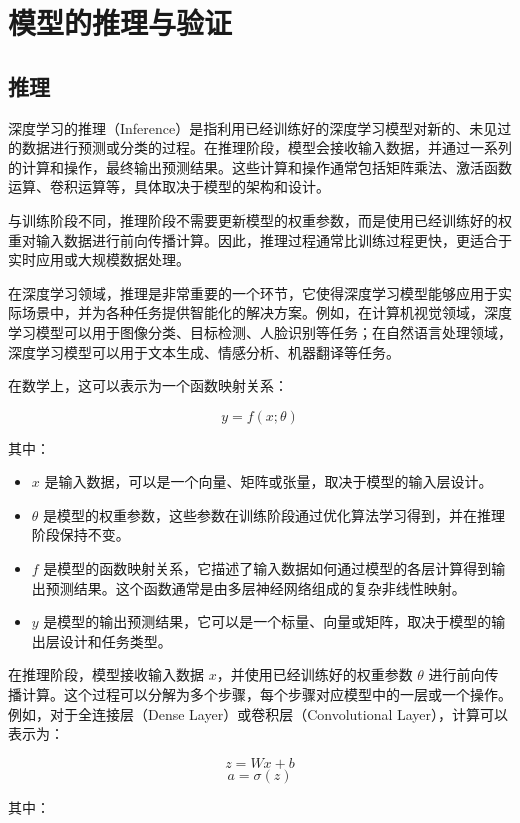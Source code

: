 \chapter{模型的推理与验证}
\label{chapter:5}

\section{推理}

深度学习的推理（Inference）是指利用已经训练好的深度学习模型对新的、未见过的数据进行预测或分类的过程。在推理阶段，模型会接收输入数据，并通过一系列的计算和操作，最终输出预测结果。这些计算和操作通常包括矩阵乘法、激活函数运算、卷积运算等，具体取决于模型的架构和设计。

与训练阶段不同，推理阶段不需要更新模型的权重参数，而是使用已经训练好的权重对输入数据进行前向传播计算。因此，推理过程通常比训练过程更快，更适合于实时应用或大规模数据处理。

在深度学习领域，推理是非常重要的一个环节，它使得深度学习模型能够应用于实际场景中，并为各种任务提供智能化的解决方案。例如，在计算机视觉领域，深度学习模型可以用于图像分类、目标检测、人脸识别等任务；在自然语言处理领域，深度学习模型可以用于文本生成、情感分析、机器翻译等任务。

在数学上，这可以表示为一个函数映射关系：

\[ y = f(x; \theta) \]

其中：

\begin{itemize}
	\item $x$ 是输入数据，可以是一个向量、矩阵或张量，取决于模型的输入层设计。
	\item $\theta$ 是模型的权重参数，这些参数在训练阶段通过优化算法学习得到，并在推理阶段保持不变。
	\item $f$ 是模型的函数映射关系，它描述了输入数据如何通过模型的各层计算得到输出预测结果。这个函数通常是由多层神经网络组成的复杂非线性映射。
	\item $y$ 是模型的输出预测结果，它可以是一个标量、向量或矩阵，取决于模型的输出层设计和任务类型。
\end{itemize}

在推理阶段，模型接收输入数据 $x$，并使用已经训练好的权重参数 $\theta$ 进行前向传播计算。这个过程可以分解为多个步骤，每个步骤对应模型中的一层或一个操作。例如，对于全连接层（Dense Layer）或卷积层（Convolutional Layer），计算可以表示为：

\[ z = Wx + b \]
\[ a = \sigma(z) \]

其中：

